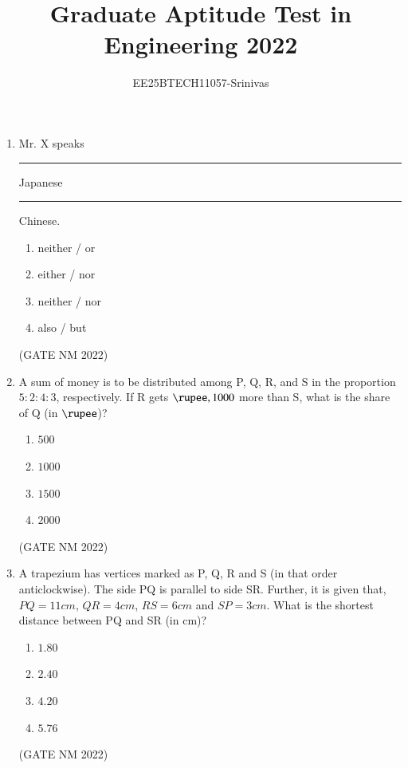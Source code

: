 \documentclass[journal,12pt,onecolumn]{IEEEtran}
\title{Graduate Aptitude Test in Engineering 2022}
\author{EE25BTECH11057-Srinivas}
\theoremstyle{remark}
\begin{document}
{\maketitle}
\begin{enumerate}
	\item  Mr. X speaks \rule{3cm}{0.15mm}   Japanese \rule{3cm}{0.15mm}  Chinese.
		\begin{multicols}{4}
\begin {enumerate}
\item  neither / or 
\item  either / nor 
\item  neither / nor 
\item  also / but 
\end{enumerate}
\end{multicols}

\hfill(GATE NM 2022) 

\item  A sum of money is to be distributed among P, Q, R, and S in the proportion $5 : 2 : 4 : 3$, respectively.
If R gets $\rupee,1000$ more than S, what is the share of Q (in $\rupee$)?
\begin{multicols}{4}
\begin{enumerate}
	\item $500$ 
	\item $1000$
	\item $1500$ 
	\item $2000$ 
\end{enumerate}
\end{multicols}

\hfill(GATE NM 2022)

\item  A trapezium has vertices marked as P, Q, R and S (in that order anticlockwise).  
The side PQ is parallel to side SR. Further, it is given that,  
$PQ = 11 cm$, $QR = 4 cm$, $RS = 6 cm$ and $SP = 3 cm$.  
What is the shortest distance between PQ and SR (in cm)?
\begin{multicols}{4}
\begin{enumerate}
	\item $1.80$ 
	\item $2.40$ 
	\item $4.20$ 
	\item $5.76$ 
\end{enumerate}
\end{multicols}

\hfill(GATE NM 2022)


\end{enumerate}
\end{document}
